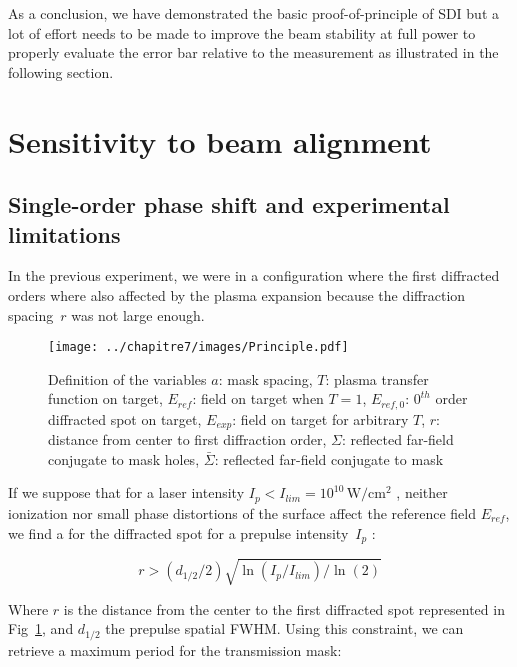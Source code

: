\vspace{0.1in}

\noindent As a conclusion, we have demonstrated the basic proof-of-principle of SDI but a lot of effort needs to be made to improve the beam stability at full power to properly evaluate the error bar relative to the measurement as illustrated in the following section.

\section{Sensitivity to beam alignment}

\subsection{Single-order phase shift and experimental limitations}

In the previous experiment, we were in a configuration where the first diffracted orders where also affected by the plasma expansion because the diffraction spacing~$r$ was not large enough.

\begin{figure}[H]
\centering
\texttt{[image: ../chapitre7/images/Principle.pdf]}\\\caption{\label{fig:Principle} Definition of the variables $a$: mask spacing, $T$: plasma transfer function on target, $E_{ref}$: field on target when $T=1$, $E_{ref,0}$: $0^{th}$ order diffracted spot on target, $E_{exp}$: field on target for arbitrary $T$, $r$: distance from center to first diffraction order, $\Sigma$: reflected far-field conjugate to mask holes, $\bar{\Sigma}$: reflected far-field conjugate to mask}
\end{figure}

\noindent If we suppose that for a laser intensity $I_p < I_{lim} = 10^{10}\,\mathrm{W/cm^2}$ , neither ionization nor small phase distortions of the surface affect the reference field $E_{ref}$, we find a  for the diffracted spot for a prepulse intensity~$I_p$ :

\begin{equation}
r > (d_{1/2}/2)\sqrt{\ln(I_p/I_{lim})/\ln(2)}
\end{equation}

\noindent Where $r$ is the distance from the center to the first diffracted spot  represented in Fig~\ref{fig:Principle}, and $d_{1/2}$ the prepulse spatial FWHM.
Using this constraint, we can retrieve a maximum period for the transmission mask:

